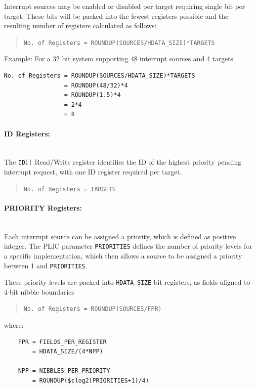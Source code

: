 Interrupt sources may be enabled or disabled per target requiring single bit per target.
These bits will be packed into the fewest registers possible and the resulting number of registers calculated as follows:

\begin{quote}
\texttt{No.\ of\ Registers\ =\ ROUNDUP(SOURCES/HDATA\_SIZE)*TARGETS}
\end{quote}

Example: For a 32 bit system supporting 48 interrupt sources and 4 targets

\begin{verbatim}
No. of Registers = ROUNDUP(SOURCES/HDATA_SIZE)*TARGETS
                 = ROUNDUP(48/32)*4
                 = ROUNDUP(1.5)*4
                 = 2*4
                 = 8
\end{verbatim}

\paragraph{ID Registers:} ~\\

The \texttt{ID[]} Read/Write register identifies the ID of the highest priority pending interrupt request, with one ID register required per target.

\begin{quote}
\texttt{No.\ of\ Registers\ =\ TARGETS}
\end{quote}

\paragraph{PRIORITY Registers:} ~\\

Each interrupt source can be assigned a priority, which is defined as positive integer.
The PLIC parameter \texttt{PRIORITIES} defines the number of priority levels for a specific implementation, which then
allows a source to be assigned a priority between 1 and \texttt{PRIORITIES}.

These priority levels are packed into \texttt{HDATA\_SIZE} bit registers, as fields aligned to 4-bit nibble boundaries

\begin{quote}
\texttt{No.\ of\ Registers\ =\ ROUNDUP(SOURCES/FPR)}
\end{quote}
where:
\indent
\begin{verbatim}
    FPR = FIELDS_PER_REGISTER    
        = HDATA_SIZE/(4*NPP)

    NPP = NIBBLES_PER_PRIORITY
        = ROUNDUP($clog2(PRIORITIES+1)/4)
\end{verbatim}

